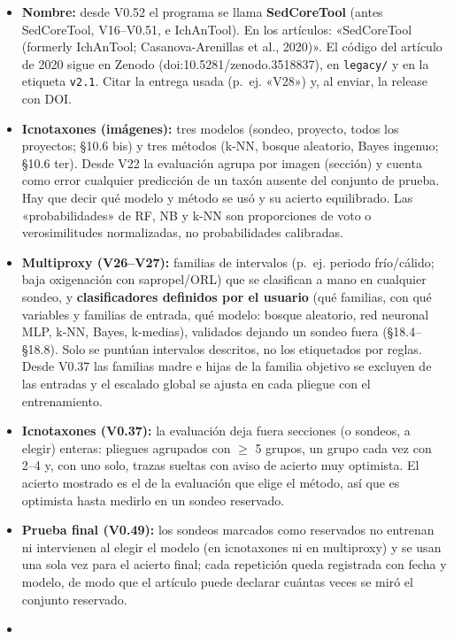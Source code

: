 \documentclass[
  10pt,
]{article}
\providecommand{\tightlist}{%
  \setlength{\itemsep}{0pt}\setlength{\parskip}{0pt}}
\begin{document}
\begin{itemize}
\tightlist
\item
  \textbf{Nombre:} desde V0.52 el programa se llama \textbf{SedCoreTool}
  (antes SedCoreTool, V16--V0.51, e IchAnTool). En los artículos:
  «SedCoreTool (formerly IchAnTool; Casanova-Arenillas et al., 2020)».
  El código del artículo de 2020 sigue en Zenodo
  (doi:10.5281/zenodo.3518837), en \texttt{legacy/} y en la etiqueta
  \texttt{v2.1}. Citar la entrega usada (p.~ej. «V28») y, al enviar, la
  release con DOI.
\item
  \textbf{Icnotaxones (imágenes):} tres modelos (sondeo, proyecto, todos
  los proyectos; §10.6 bis) y tres métodos (k-NN, bosque aleatorio,
  Bayes ingenuo; §10.6 ter). Desde V22 la evaluación agrupa por imagen
  (sección) y cuenta como error cualquier predicción de un taxón ausente
  del conjunto de prueba. Hay que decir qué modelo y método se usó y su
  acierto equilibrado. Las «probabilidades» de RF, NB y k-NN son
  proporciones de voto o verosimilitudes normalizadas, no probabilidades
  calibradas.
\item
  \textbf{Multiproxy (V26--V27):} familias de intervalos (p.~ej. periodo
  frío/cálido; baja oxigenación con sapropel/ORL) que se clasifican a
  mano en cualquier sondeo, y \textbf{clasificadores definidos por el
  usuario} (qué familias, con qué variables y familias de entrada, qué
  modelo: bosque aleatorio, red neuronal MLP, k-NN, Bayes, k-medias),
  validados dejando un sondeo fuera (§18.4--§18.8). Solo se puntúan
  intervalos descritos, no los etiquetados por reglas. Desde V0.37 las
  familias madre e hijas de la familia objetivo se excluyen de las
  entradas y el escalado global se ajusta en cada pliegue con el
  entrenamiento.
\item
  \textbf{Icnotaxones (V0.37):} la evaluación deja fuera secciones (o
  sondeos, a elegir) enteras: pliegues agrupados con $\geq$ 5 grupos, un
  grupo cada vez con 2--4 y, con uno solo, trazas sueltas con aviso de
  acierto muy optimista. El acierto mostrado es el de la evaluación que
  elige el método, así que es optimista hasta medirlo en un sondeo
  reservado.
\item
  \textbf{Prueba final (V0.49):} los sondeos marcados como reservados no
  entrenan ni intervienen al elegir el modelo (en icnotaxones ni en
  multiproxy) y se usan una sola vez para el acierto final; cada
  repetición queda registrada con fecha y modelo, de modo que el
  artículo puede declarar cuántas veces se miró el conjunto reservado.
\item

\end{itemize}
\end{document}
